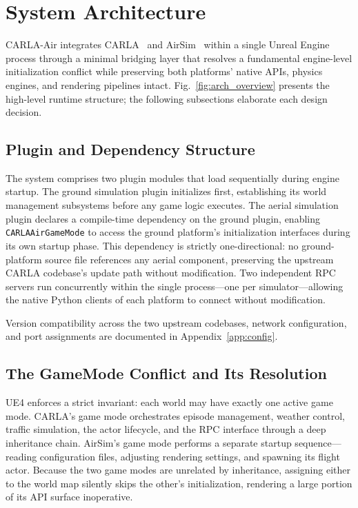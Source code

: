 
\section{System Architecture}
\label{sec:architecture}

CARLA-Air integrates CARLA~\cite{carla} and AirSim~\cite{airsim} within a
single Unreal Engine~\cite{ue4} process through a minimal bridging layer that
resolves a fundamental engine-level initialization conflict while preserving
both platforms' native APIs, physics engines, and rendering pipelines intact.
Fig.~\ref{fig:arch_overview} presents the high-level runtime structure; the
following subsections elaborate each design decision.



\subsection{Plugin and Dependency Structure}
\label{sec:arch:plugins}

The system comprises two plugin modules that load sequentially during engine
startup.
The ground simulation plugin initializes first, establishing its world
management subsystems before any game logic executes.
The aerial simulation plugin declares a compile-time dependency on the ground
plugin, enabling \texttt{CARLAAirGameMode} to access the ground platform's
initialization interfaces during its own startup phase.
This dependency is strictly one-directional: no ground-platform source file
references any aerial component, preserving the upstream CARLA codebase's
update path without modification.
Two independent RPC servers run concurrently within the single
process---one per simulator---allowing the native Python clients of each
platform to connect without modification.

Version compatibility across the two upstream codebases, network configuration,
and port assignments are documented in Appendix~\ref{app:config}.

\subsection{The GameMode Conflict and Its Resolution}
\label{sec:arch:gamemode}

UE4 enforces a strict invariant: each world may have exactly one active game
mode.
CARLA's game mode orchestrates episode management, weather control, traffic
simulation, the actor lifecycle, and the RPC interface through a deep
inheritance chain.
AirSim's game mode performs a separate startup sequence---reading configuration
files, adjusting rendering settings, and spawning its flight actor.
Because the two game modes are unrelated by inheritance, assigning either to the
world map silently skips the other's initialization, rendering a large portion
of its API surface inoperative.

